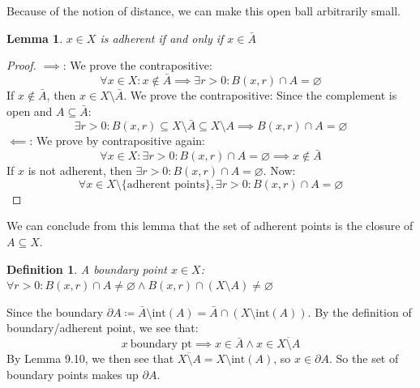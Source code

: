 \documentclass{article}
\newtheorem{lem}{Lemma}[section]
\newtheorem{defn}{Definition}[section]
\begin{document}
Because of the notion of distance, we can make this open ball arbitrarily small.\\

\medskip
\begin{lem}
$x \in X$ is adherent if and only if $x \in \bar{A}$
\end{lem}
\begin{proof}
$\implies$: We prove the contrapositive:
\begin{equation*}
\forall x \in X: x \notin \bar{A} \implies \exists r > 0: B(x, r) \cap A = \varnothing
\end{equation*}
If $x \notin \bar{A}$, then $x \in X \setminus \bar{A}$. We prove the contrapositive: Since the complement is open and $A \subseteq \bar{A}$:
\begin{equation*}
    \exists r > 0: B(x, r) \subseteq X \setminus \bar{A} \subseteq X \setminus A \implies B(x, r) \cap A = \varnothing
\end{equation*}
$\impliedby$: We prove by contrapositive again:
\begin{equation*}
\forall x \in X: \exists r > 0: B(x, r) \cap A = \varnothing \implies x \notin \bar{A}
\end{equation*}
If $x$ is not adherent, then $\exists r > 0: B(x, r) \cap A = \varnothing$. Now:
\begin{equation*}
    \forall x \in X \setminus \{\text{adherent points}\}, \exists r > 0: B(x, r) \cap A = \varnothing
\end{equation*}

\end{proof}
We can conclude from this lemma that the set of adherent points is the closure of $A \subseteq X$.

\pagebreak
\begin{defn}
A boundary point $x \in X$: $\forall r > 0: B(x, r) \cap A \neq \varnothing \land B(x, r) \cap (X \setminus A) \neq \varnothing$
\end{defn}
Since the boundary $\partial A \coloneq \bar{A} \setminus \text{int}(A) = \bar{A} \cap (X \setminus \text{int}(A))$. By the definition of boundary/adherent point, we see that:
\begin{equation*}
    x \ \text{boundary pt} \implies x \in \bar{A} \land x \in \overline{X \setminus A}
\end{equation*}
By Lemma 9.10, we then see that $\overline{X \setminus A} = X \setminus \text{int}(A)$, so $x \in \partial A$. So the set of boundary points makes up $\partial A$.
\end{document}
